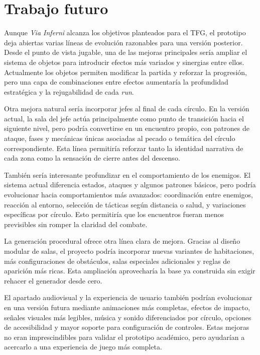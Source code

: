 \section{Trabajo futuro}
Aunque \textit{Via Inferni} alcanza los objetivos planteados para el TFG, el prototipo deja
abiertas varias líneas de evolución razonables para una versión posterior. Desde el punto
de vista jugable, una de las mejoras principales sería ampliar el sistema de objetos para
introducir efectos más variados y sinergias entre ellos. Actualmente los objetos permiten
modificar la partida y reforzar la progresión, pero una capa de combinaciones entre efectos
aumentaría la profundidad estratégica y la rejugabilidad de cada \textit{run}.

Otra mejora natural sería incorporar jefes al final de cada círculo. En la versión actual,
la sala del jefe actúa principalmente como punto de transición hacia el siguiente nivel, pero
podría convertirse en un encuentro propio, con patrones de ataque, fases y mecánicas únicas
asociadas al pecado o temática del círculo correspondiente. Esta línea permitiría reforzar
tanto la identidad narrativa de cada zona como la sensación de cierre antes del descenso.

También sería interesante profundizar en el comportamiento de los enemigos. El sistema
actual diferencia estados, ataques y algunos patrones básicos, pero podría evolucionar hacia
comportamientos más avanzados: coordinación entre enemigos, reacción al entorno, selección
de tácticas según distancia o salud, y variaciones específicas por círculo. Esto permitiría
que los encuentros fueran menos previsibles sin romper la claridad del combate.

La generación procedural ofrece otra línea clara de mejora. Gracias al diseño modular de
salas, el proyecto podría incorporar nuevas variantes de habitaciones, más configuraciones
de obstáculos, salas especiales adicionales y reglas de aparición más ricas. Esta ampliación
aprovecharía la base ya construida sin exigir rehacer el generador desde cero.

El apartado audiovisual y la experiencia de usuario también podrían evolucionar en una
versión futura mediante animaciones más completas, efectos de impacto, señales visuales más
legibles, música y sonido diferenciados por círculo, opciones de accesibilidad y mayor
soporte para configuración de controles. Estas mejoras no eran imprescindibles para validar
el prototipo académico, pero ayudarían a acercarlo a una experiencia de juego más completa.

